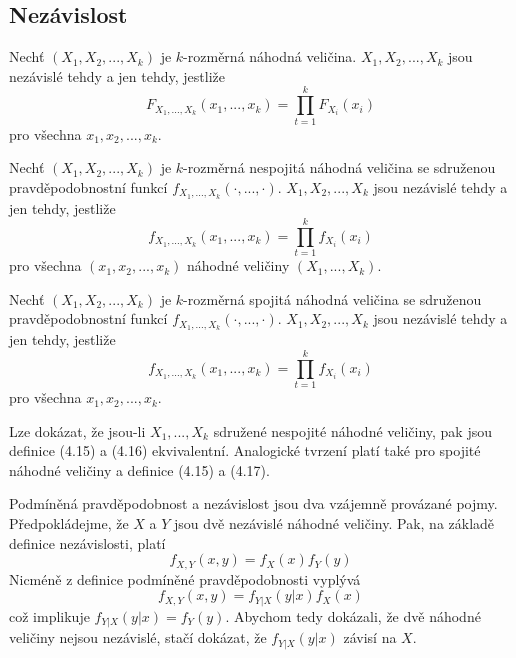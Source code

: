 \subsection{Nezávislost}

\begin{definition}[Nezávislost]
Nechť $(X_1, X_2, ..., X_k)$ je $k$-rozměrná náhodná veličina. $X_1, X_2, ..., X_k$ jsou nezávislé tehdy a jen tehdy, jestliže
\begin{equation*}
F_{X_1, ..., X_k}(x_1, ..., x_k) = \prod_{t = 1}^k F_{X_i}(x_i)
\end{equation*}
pro všechna $x_1, x_2, ..., x_k$.
\end{definition}

\begin{definition}[Nezávislost]
Nechť $(X_1, X_2, ..., X_k)$ je $k$-rozměrná nespojitá náhodná veličina se sdruženou pravděpodobnostní funkcí $f_{X_1, ...,X_k}(\cdot, ..., \cdot)$. $X_1, X_2, ..., X_k$ jsou nezávislé tehdy a jen tehdy, jestliže
\begin{equation*}
f_{X_1, ..., X_k}(x_1, ..., x_k) = \prod_{t = 1}^k f_{X_i}(x_i)
\end{equation*}
pro všechna $(x_1, x_2, ..., x_k)$ náhodné veličiny $(X_1, ..., X_k)$.
\end{definition}

\begin{definition}[Nezávislost]
Nechť $(X_1, X_2, ..., X_k)$ je $k$-rozměrná spojitá náhodná veličina se sdruženou pravděpodobnostní funkcí $f_{X_1, ...,X_k}(\cdot, ..., \cdot)$. $X_1, X_2, ..., X_k$ jsou nezávislé tehdy a jen tehdy, jestliže
\begin{equation*}
f_{X_1, ..., X_k}(x_1, ..., x_k) = \prod_{t = 1}^k f_{X_i}(x_i)
\end{equation*}
pro všechna $x_1, x_2, ..., x_k$.
\end{definition}

Lze dokázat, že jsou-li $X_1, ..., X_k$ sdružené nespojité náhodné veličiny, pak jsou definice (4.15) a (4.16) ekvivalentní. Analogické tvrzení platí také pro spojité náhodné veličiny a definice (4.15) a (4.17).

Podmíněná pravděpodobnost a nezávislost jsou dva vzájemně provázané pojmy. Předpokládejme, že $X$ a $Y$ jsou dvě nezávislé náhodné veličiny. Pak, na základě definice nezávislosti, platí
\begin{equation*}
f_{X,Y}(x,y) = f_X(x)f_Y(y)
\end{equation*}
Nicméně z definice podmíněné pravděpodobnosti vyplývá
\begin{equation*}
f_{X,Y}(x,y) = f_{Y|X}(y|x)f_X(x)
\end{equation*}
což implikuje $f_{Y|X}(y|x) = f_Y(y)$. Abychom tedy dokázali, že dvě náhodné veličiny nejsou nezávislé, stačí dokázat, že $f_{Y|X}(y|x)$ závisí na $X$.


